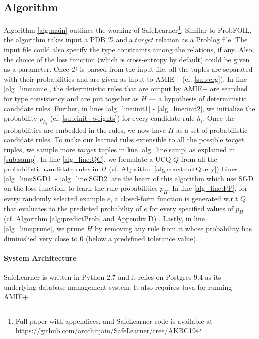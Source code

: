 \documentclass[akbc,twoside,11pt]{article}
\newcounter{example}
\newcommand{\algorithmname}{SafeLearner\xspace}
\begin{document}
\subsection{Algorithm} Algorithm \ref{alg:main} outlines the working of \algorithmname \footnote{Full paper with appendices, and \algorithmname code is available at \url{https://github.com/arcchitjain/SafeLearner/tree/AKBC19}}. Similar to ProbFOIL, the algorithm takes input a PDB $\mathcal{D}$ and a $target$ relation as a Problog file. The input file could also specify the type constraints among the relations, if any. Also, the choice of the loss function (which is cross-entropy by default) could be given as a parameter. Once $\mathcal{D}$ is parsed from the input file, all the tuples are separated with their probabilities and are given as input to AMIE+ (cf. \ref{sub:crg}). In line \ref{alg_line:amie}, the deterministic rules that are output by AMIE+ are searched for type consistency and are put together as $H$ --- a hypothesis of deterministic candidate rules. Further, in lines \ref{alg_line:init1} - \ref{alg_line:init2}, we initialize the probability $p_{h_i}$ (cf. \ref{sub:init_weights}) for every candidate rule $h_i$. 
Once the probabilities are embedded in the rules, we now have $H$ as a set of probabilistic candidate rules. 
To make our learned rules extensible to all the possible $target$ tuples, we sample more $target$ tuples in line \ref{alg_line:samp} as explained in \ref{sub:samp}. In line \ref{alg_line:QC}, we formulate a UCQ $Q$ from all the probabilistic candidate rules in $H$ (cf. Algorithm \ref{alg:constructQuery})
Lines \ref{alg_line:SGD1} - \ref{alg_line:SGD2} are the heart of this algorithm which use SGD on the loss function, to learn the rule probabilities $p_H$. In line \ref{alg_line:PP}, for every randomly selected example $e$, a closed-form function is generated w.r.t $Q$ that evaluates to the predicted probability of $e$ for every specified values of $p_H$ (cf. Algorithm \ref{alg:predictProb} and Appendix D) . Lastly, in line \ref{alg_line:prune}, we prune $H$ by removing any rule from it whose probability has diminished very close to 0 (below a predefined tolerance value).


\paragraph{System Architecture}
\algorithmname is written in Python 2.7 and it relies on Postgres 9.4 as its underlying database management system. It also requires Java for running AMIE+.
\end{document}
